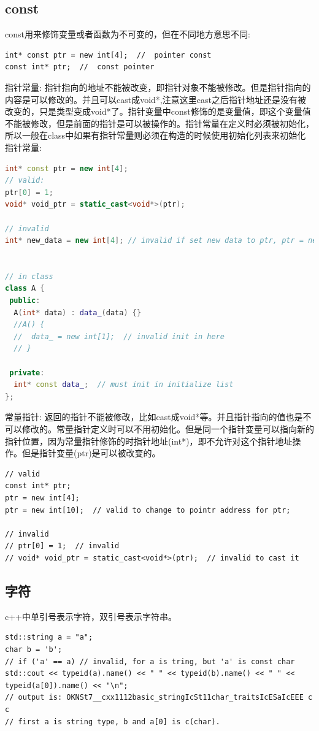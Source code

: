 \documentclass[12pt]{book}
\begin{document}
\subsection{const}
const用来修饰变量或者函数为不可变的，但在不同地方意思不同:
\begin{lstlisting}
int* const ptr = new int[4];  //  pointer const
const int* ptr;  //  const pointer
\end{lstlisting}
指针常量: 指针指向的地址不能被改变，即指针对象不能被修改。但是指针指向的内容是可以修改的。并且可以cast成void*,注意这里cast之后指针地址还是没有被改变的，只是类型变成void*了。指针变量中const修饰的是变量值，即这个变量值不能被修改，但是前面的指针是可以被操作的。指针常量在定义时必须被初始化，所以一般在class中如果有指针常量则必须在构造的时候使用初始化列表来初始化指针常量:
\begin{lstlisting}[language=C++]
int* const ptr = new int[4];
// valid:
ptr[0] = 1;
void* void_ptr = static_cast<void*>(ptr);

// invalid
int* new_data = new int[4]; // invalid if set new data to ptr, ptr = new_data;


// in class
class A {
 public:
  A(int* data) : data_(data) {}
  //A() {
  //  data_ = new int[1];  // invalid init in here
  // }
	
 private:
  int* const data_;  // must init in initialize list 
};
\end{lstlisting}
常量指针: 返回的指针不能被修改，比如cast成void*等。并且指针指向的值也是不可以修改的。常量指针定义时可以不用初始化。但是同一个指针变量可以指向新的指针位置，因为常量指针修饰的时指针地址(int*)，即不允许对这个指针地址操作。但是指针变量(ptr)是可以被改变的。
\begin{lstlisting}
// valid
const int* ptr;
ptr = new int[4];
ptr = new int[10];  // valid to change to pointr address for ptr;

// invalid
// ptr[0] = 1;  // invalid
// void* void_ptr = static_cast<void*>(ptr);  // invalid to cast it
\end{lstlisting}

\subsection{字符}
c++中单引号表示字符，双引号表示字符串。

\begin{lstlisting}
std::string a = "a";
char b = 'b';
// if ('a' == a) // invalid, for a is tring, but 'a' is const char
std::cout << typeid(a).name() << " " << typeid(b).name() << " " << typeid(a[0]).name() << "\n";
// output is: OKNSt7__cxx1112basic_stringIcSt11char_traitsIcESaIcEEE c c
// first a is string type, b and a[0] is c(char).
\end{lstlisting}
	
\end{document}
